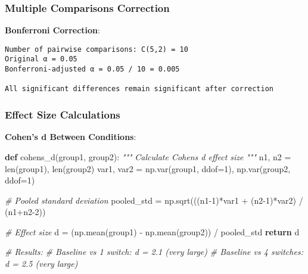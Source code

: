 \documentclass[
  11pt]{article}
\newenvironment{Shaded}{}{}
\newcommand{\BuiltInTok}[1]{\textcolor[rgb]{0.00,0.50,0.00}{#1}}
\newcommand{\CommentTok}[1]{\textcolor[rgb]{0.38,0.63,0.69}{\textit{#1}}}
\newcommand{\ControlFlowTok}[1]{\textcolor[rgb]{0.00,0.44,0.13}{\textbf{#1}}}
\newcommand{\DecValTok}[1]{\textcolor[rgb]{0.25,0.63,0.44}{#1}}
\newcommand{\KeywordTok}[1]{\textcolor[rgb]{0.00,0.44,0.13}{\textbf{#1}}}
\newcommand{\NormalTok}[1]{#1}
\newcommand{\OperatorTok}[1]{\textcolor[rgb]{0.40,0.40,0.40}{#1}}
\begin{document}
\subsubsection{Multiple Comparisons
Correction}\label{multiple-comparisons-correction}

\textbf{Bonferroni Correction}:

\begin{verbatim}
Number of pairwise comparisons: C(5,2) = 10
Original α = 0.05
Bonferroni-adjusted α = 0.05 / 10 = 0.005

All significant differences remain significant after correction
\end{verbatim}

\subsubsection{Effect Size Calculations}\label{effect-size-calculations}

\textbf{Cohen's d Between Conditions}:

\begin{Shaded}
\begin{Highlighting}[]
\KeywordTok{def}\NormalTok{ cohens\_d(group1, group2):}
    \CommentTok{"""}
\CommentTok{    Calculate Cohen\textquotesingle{}s d effect size}
\CommentTok{    """}
\NormalTok{    n1, n2 }\OperatorTok{=} \BuiltInTok{len}\NormalTok{(group1), }\BuiltInTok{len}\NormalTok{(group2)}
\NormalTok{    var1, var2 }\OperatorTok{=}\NormalTok{ np.var(group1, ddof}\OperatorTok{=}\DecValTok{1}\NormalTok{), np.var(group2, ddof}\OperatorTok{=}\DecValTok{1}\NormalTok{)}
    
    \CommentTok{\# Pooled standard deviation}
\NormalTok{    pooled\_std }\OperatorTok{=}\NormalTok{ np.sqrt(((n1}\OperatorTok{{-}}\DecValTok{1}\NormalTok{)}\OperatorTok{*}\NormalTok{var1 }\OperatorTok{+}\NormalTok{ (n2}\OperatorTok{{-}}\DecValTok{1}\NormalTok{)}\OperatorTok{*}\NormalTok{var2) }\OperatorTok{/}\NormalTok{ (n1}\OperatorTok{+}\NormalTok{n2}\OperatorTok{{-}}\DecValTok{2}\NormalTok{))}
    
    \CommentTok{\# Effect size}
\NormalTok{    d }\OperatorTok{=}\NormalTok{ (np.mean(group1) }\OperatorTok{{-}}\NormalTok{ np.mean(group2)) }\OperatorTok{/}\NormalTok{ pooled\_std}
    \ControlFlowTok{return}\NormalTok{ d}

\CommentTok{\# Results:}
\CommentTok{\# Baseline vs 1 switch: d = 2.1 (very large)}
\CommentTok{\# Baseline vs 4 switches: d = 2.5 (very large)}
\end{Highlighting}
\end{Shaded}
\end{document}

